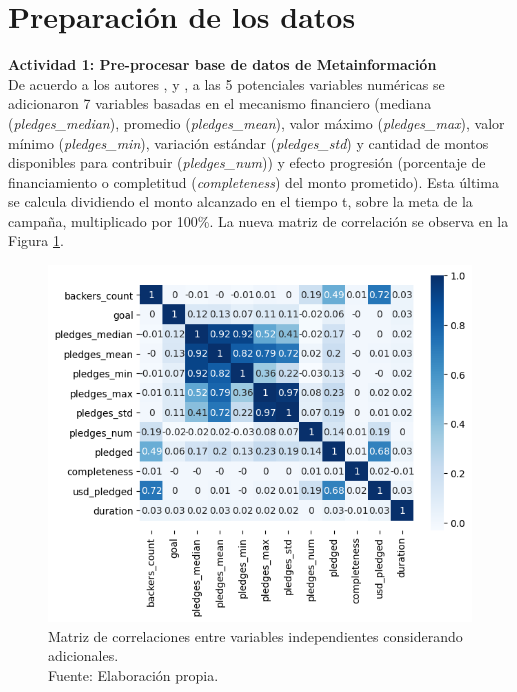 \section{Preparación de los datos}
\textbf{Actividad 1: Pre-procesar base de datos de Metainformación}
\\
De acuerdo a los autores \cite{pr_chen2013kickpredict}, \cite{pr_chen2015predcrowd} y \cite{pr_jin2019dayssuccess}, a las 5 potenciales variables numéricas se adicionaron 7 variables basadas en el mecanismo financiero (mediana (\textit{pledges\_median}), promedio (\textit{pledges\_mean}), valor máximo (\textit{pledges\_max}), valor mínimo (\textit{pledges\_min}), variación estándar (\textit{pledges\_std}) y cantidad de montos disponibles para contribuir (\textit{pledges\_num})) y efecto progresión (porcentaje de financiamiento o completitud (\textit{completeness}) del monto prometido). Esta última se calcula dividiendo el monto alcanzado en el tiempo t, sobre la meta de la campaña, multiplicado por 100\%. La nueva matriz de correlación se observa en la Figura \ref{4:fig27}.

\begin{figure}[!ht]
	\begin{center}
		\includegraphics[width=1.00\textwidth]{4/figures/metadata correlation v2.png}
		\caption[Matriz de correlaciones entre variables independientes considerando adicionales]{Matriz de correlaciones entre variables independientes considerando adicionales.\\
			Fuente: Elaboración propia.}
		\label{4:fig27}
	\end{center}
\end{figure}

